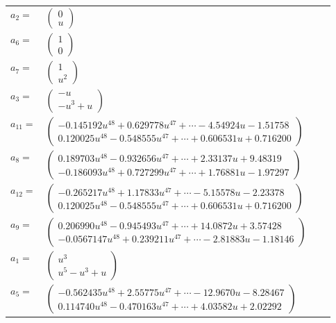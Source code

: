\documentclass[1p]{elsarticle_modified}
\theoremstyle{definition}
\begin{document}
\begin{tabular}{m{7pt} m{180pt} m{7pt} m{180pt} }
\flushright $a_{2}=$&$\begin{pmatrix}0\\u\end{pmatrix}$ \\
\flushright $a_{6}=$&$\begin{pmatrix}1\\0\end{pmatrix}$ \\
\flushright $a_{7}=$&$\begin{pmatrix}1\\u^2\end{pmatrix}$ \\
\flushright $a_{3}=$&$\begin{pmatrix}- u\\- u^3+u\end{pmatrix}$ \\
\flushright $a_{11}=$&$\begin{pmatrix}-0.145192 u^{48}+0.629778 u^{47}+\cdots-4.54924 u-1.51758\\0.120025 u^{48}-0.548555 u^{47}+\cdots+0.606531 u+0.716200\end{pmatrix}$ \\
\flushright $a_{8}=$&$\begin{pmatrix}0.189703 u^{48}-0.932656 u^{47}+\cdots+2.33137 u+9.48319\\-0.186093 u^{48}+0.727299 u^{47}+\cdots+1.76881 u-1.97297\end{pmatrix}$ \\
\flushright $a_{12}=$&$\begin{pmatrix}-0.265217 u^{48}+1.17833 u^{47}+\cdots-5.15578 u-2.23378\\0.120025 u^{48}-0.548555 u^{47}+\cdots+0.606531 u+0.716200\end{pmatrix}$ \\
\flushright $a_{9}=$&$\begin{pmatrix}0.206990 u^{48}-0.945493 u^{47}+\cdots+14.0872 u+3.57428\\-0.0567147 u^{48}+0.239211 u^{47}+\cdots-2.81883 u-1.18146\end{pmatrix}$ \\
\flushright $a_{1}=$&$\begin{pmatrix}u^3\\u^5- u^3+u\end{pmatrix}$ \\
\flushright $a_{5}=$&$\begin{pmatrix}-0.562435 u^{48}+2.55775 u^{47}+\cdots-12.9670 u-8.28467\\0.114740 u^{48}-0.470163 u^{47}+\cdots+4.03582 u+2.02292\end{pmatrix}$ \\

\end{tabular}
\end{document}
